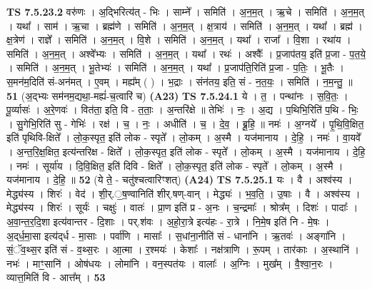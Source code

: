 \documentclass[17pt]{extarticle}
\begin{document}
                  \newline
                                \textbf{ TS 7.5.23.2} \newline
                  वरु॑णः । अ॒द्भिरित्य॑त् - भिः । साम्ने᳚ । समिति॑ । अ॒न॒म॒त् । ऋ॒चे । समिति॑ । अ॒न॒म॒त् । यथा᳚ । साम॑ । ऋ॒चा । ब्रह्म॑णे । समिति॑ । अ॒न॒म॒त् । क्ष॒त्राय॑ । समिति॑ । अ॒न॒म॒त् । यथा᳚ । ब्रह्म॑ । क्ष॒त्रेण॑ । राज्ञे᳚ । समिति॑ । अ॒न॒म॒त् । वि॒शे । समिति॑ । अ॒न॒म॒त् । यथा᳚ । राजा᳚ । वि॒शा । रथा॑य । समिति॑ । अ॒न॒म॒त् । अश्वे᳚भ्यः । समिति॑ । अ॒न॒म॒त् । यथा᳚ । रथः॑ । अश्वैः᳚ । प्र॒जाप॑तय॒ इति॑ प्र॒जा - प॒त॒ये॒ । समिति॑ । अ॒न॒म॒त् । भू॒तेभ्यः॑ । समिति॑ । अ॒न॒म॒त् । यथा᳚ । प्र॒जाप॑ति॒रिति॑ प्र॒जा - प॒तिः॒ । भू॒तैः । स॒मन॑म॒दिति॑ सं-अन॑मत् । ए॒वम् । मह्य᳚म् ( ) । भ॒द्राः । संन॑तय॒ इति॒ सं - न॒त॒यः॒ । समिति॑ । न॒म॒न्तु॒ ॥ \textbf{  51} \newline
                  \newline
                      (अ॒द्भ्यः सम॑नम॒द्यथा॒-मह्यं॑-च॒त्वारि॑ च)  \textbf{(A23)} \newline \newline
                                \textbf{ TS 7.5.24.1} \newline
                  ये । त॒ । पन्था॑नः । स॒वि॒तः॒ । पू॒र्व्यासः॑ । अ॒रे॒णवः॑ । वित॑ता॒ इति॒ वि - त॒ताः॒ । अ॒न्तरि॑क्षे ॥ तेभिः॑ । नः॒ । अ॒द्य । प॒थिभि॒रिति॑ प॒थि - भिः॒ । सु॒गेभि॒रिति॑ सु - गेभिः॑ । रक्ष॑ । च॒ । नः॒ । अधीति॑ । च॒ । दे॒व॒ । ब्रू॒हि॒ ॥ नमः॑ । अ॒ग्नये᳚ । पृ॒थि॒वि॒क्षित॒ इति॑ पृथिवि-क्षिते᳚ । लो॒क॒स्पृत॒ इति॑ लोक - स्पृते᳚ । लो॒कम् । अ॒स्मै । यज॑मानाय । दे॒हि॒ । नमः॑ । वा॒यवे᳚ । अ॒न्त॒रि॒क्ष॒क्षित॒ इत्य॑न्तरिक्ष - क्षिते᳚ । लो॒क॒स्पृत॒ इति॑ लोक - स्पृते᳚ । लो॒कम् । अ॒स्मै । यज॑मानाय । दे॒हि॒ । नमः॑ । सूर्या॑य । दि॒वि॒क्षित॒ इति॑ दिवि - क्षिते᳚ । लो॒क॒स्पृत॒ इति॑ लोक - स्पृते᳚ । लो॒कम् । अ॒स्मै । यज॑मानाय । दे॒हि॒ ॥ \textbf{  52} \newline
                  \newline
                      (ये ते॒ - चतु॑श्चत्वारिꣳशत्)  \textbf{(A24)} \newline \newline
                                \textbf{ TS 7.5.25.1} \newline
                  यः । वै । अश्व॑स्य । मेद्ध्य॑स्य । शिरः॑ । वेद॑ । शी॒र्.॒ष॒ण्वानिति॑ शीर्.षण्-वान् । मेद्ध्यः॑ । भ॒व॒ति॒ । उ॒षाः । वै । अश्व॑स्य । मेद्ध्य॑स्य । शिरः॑ । सूर्यः॑ । चक्षुः॑ । वातः॑ । प्रा॒ण इति॑ प्र - अ॒नः । च॒न्द्रमाः᳚ । श्रोत्र᳚म् । दिशः॑ । पादाः᳚ । अ॒वा॒न्त॒र॒दि॒शा इत्य॑वान्तर - दि॒शाः । पर्.श॑वः । अ॒हो॒रा॒त्रे इत्य॑हः - रा॒त्रे । नि॒मे॒ष इति॑ नि - मे॒षः । अ॒द्‌र्ध॒मा॒सा इत्य॑द्‌र्ध - मा॒साः । पर्वा॑णि । मासाः᳚ । स॒धांना॒नीति॑ सं - धाना॑नि । ऋ॒तवः॑ । अङ्गा॑नि । सं॒ॅव॒थ्स॒र इति॑ सं - व॒थ्स॒रः । आ॒त्मा । र॒श्मयः॑ । केशाः᳚ । नक्ष॑त्राणि । रू॒पम् । तार॑काः । अ॒स्थानि॑ । नभः॑ । माꣳ॒॒सानि॑ । ओष॑धयः । लोमा॑नि । वन॒स्पत॑यः । वालाः᳚ । अ॒ग्निः । मुख᳚म् । वै॒श्वा॒न॒रः । व्यात्त॒मिति॑ वि - आत्त᳚म् । \textbf{  53} \newline
\end{document}
